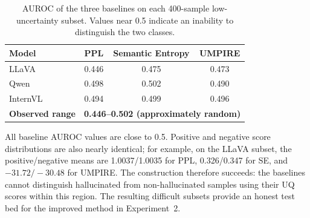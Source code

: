 \begin{table}[H]
\centering
\caption{AUROC of the three baselines on each 400-sample low-uncertainty subset. Values near 0.5 indicate an inability to distinguish the two classes.}
\label{tab:subset_baselines}
\small
\setlength{\tabcolsep}{13pt}
\renewcommand{\arraystretch}{1.18}
\begin{tabular}{@{}lccc@{}}
\toprule
\textbf{Model} & \textbf{PPL} & \textbf{Semantic Entropy} & \textbf{UMPIRE} \\
\midrule
LLaVA & 0.446 & 0.475 & 0.473 \\
Qwen & 0.498 & 0.502 & 0.490 \\
InternVL & 0.494 & 0.499 & 0.496 \\
\rowcolor{gray!12} \textbf{Observed range} & \multicolumn{3}{c}{\textbf{0.446--0.502 (approximately random)}} \\
\bottomrule
\end{tabular}
\end{table}

All baseline AUROC values are close to 0.5. Positive and negative score distributions are also nearly identical; for example, on the LLaVA subset, the positive/negative means are 1.0037/1.0035 for PPL, 0.326/0.347 for SE, and $-31.72/-30.48$ for UMPIRE. The construction therefore succeeds: the baselines cannot distinguish hallucinated from non-hallucinated samples using their UQ scores within this region. The resulting difficult subsets provide an honest test bed for the improved method in Experiment~2.
